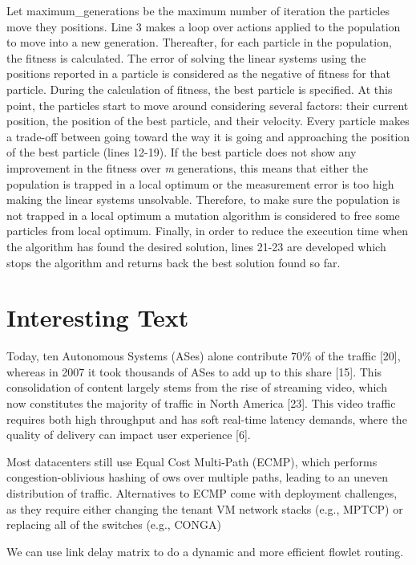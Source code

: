 \documentclass[10pt, journal, letterpaper]{IEEEtran}
\begin{document}
Let maximum\_generations be the maximum number of iteration the particles move they positions. Line 3 makes a loop over actions applied to the population to move into a new generation. Thereafter, for each particle in the population, the fitness is calculated. The error of solving the linear systems using the positions reported in a particle is considered as the negative of fitness for that particle. During the calculation of fitness, the best particle is specified. At this point, the particles start to move around considering several factors: their current position, the position of the best particle, and their velocity. Every particle makes a trade-off between going toward the way it is going and approaching the position of the best particle (lines 12-19). If the best particle does not show any improvement in the fitness over \textit{m} generations, this means that either the population is trapped in a local optimum or the measurement error is too high making the linear systems unsolvable. Therefore, to make sure the population is not trapped in a local optimum a mutation algorithm is considered to free some particles from local optimum. Finally, in order to reduce the execution time when the algorithm has found the desired solution, lines 21-23 are developed which stops the algorithm and returns back the best solution found so far.

\section{Interesting Text}
Today, ten Autonomous Systems (ASes) alone contribute 70$\%$ of the traffic [20], whereas in 2007 it took thousands of ASes to add up to this share [15]. This consolidation of content largely stems from the rise of streaming video, which now constitutes the majority of traffic in North America [23]. This video traffic requires both high throughput and has soft real-time latency demands, where the quality of delivery can impact user experience [6].\cite{schlinker2017engineering}

Most datacenters still use Equal Cost Multi-Path (ECMP), which performs congestion-oblivious hashing of  ows over multiple paths, leading to an uneven distribution of traffic. Alternatives to ECMP come with deployment challenges, as they require either changing the tenant VM network stacks (e.g., MPTCP) or replacing all of the switches (e.g., CONGA)

We can use link delay matrix to do a dynamic and more efficient flowlet routing.
\end{document}
